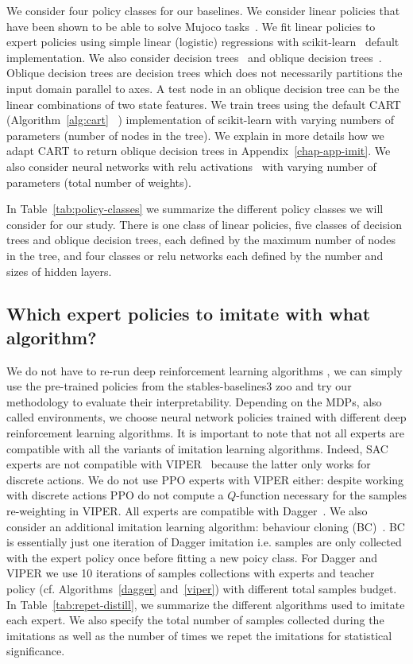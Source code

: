 We consider four policy classes for our baselines.
We consider linear policies that have been shown to be able to solve Mujoco tasks~\cite{empirical-evidence}.
We fit linear policies to expert policies using simple linear (logistic) regressions with scikit-learn~\cite{scikit-learn} default implementation.
We also consider decision trees~\cite{breiman1984clasification} and oblique decision trees~\cite{murthy1994system}.
Oblique decision trees are decision trees which does not necessarily partitions the input domain parallel to axes.
A test node in an oblique decision tree can be the linear combinations of two state features. 
We train trees using the default CART (Algorithm~\ref{alg:cart} ~\cite{breiman1984clasification}) implementation of scikit-learn with varying numbers of parameters (number of nodes in the tree).
We explain in more details how we adapt CART to return oblique decision trees in Appendix~\ref{chap-app-imit}.
We also consider neural networks with relu activations~\cite{relunet} with varying number of parameters (total number of weights).

In Table~\ref{tab:policy-classes} we summarize the different policy classes we will consider for our study.
There is one class of linear policies, five classes of decision trees and oblique decision trees, each defined by the maximum number of nodes in the tree, and four classes or relu networks each defined by the number and sizes of hidden layers.

\subsection{Which expert policies to imitate with what algorithm?}
We do not have to re-run deep reinforcement learning algorithms \cite{dqn,ppo,deep-rl-relu1}, we can simply use the pre-trained policies from the stables-baselines3 zoo \cite{zoo} and try our methodology to evaluate their interpretability.
Depending on the MDPs, also called environments, we choose neural network policies trained with different deep reinforcement learning algorithms.
It is important to note that not all experts are compatible with all the variants of imitation learning algorithms.
Indeed, SAC experts \cite{deep-rl-relu1} are not compatible with VIPER~\cite{viper} because the latter only works for discrete actions.
We do not use PPO experts with VIPER either: despite working with discrete actions PPO do not compute a $Q$-function necessary for the samples re-weighting in VIPER.
All experts are compatible with Dagger~\cite{dagger}.
We also consider an additional imitation learning algorithm: behaviour cloning (BC)~\cite{behaviour-cloning}.
BC is essentially just one iteration of Dagger imitation i.e. samples are only collected with the expert policy once before fitting a new poicy class.
For Dagger and VIPER we use 10 iterations of samples collections with experts and teacher policy (cf. Algorithms~\ref{dagger} and~\ref{viper}) with different total samples budget.
In Table~\ref{tab:repet-distill}, we summarize the different algorithms used to imitate each expert.
We also specify the total number of samples collected during the imitations as well as the number of times we repet the imitations for statistical significance.

